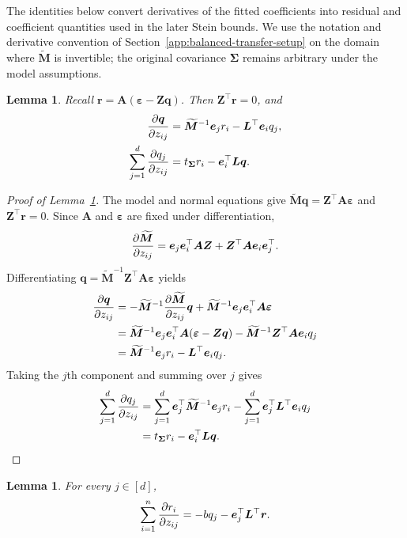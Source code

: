 \documentclass{article}
\theoremstyle{plain}
\newtheorem{lemma}[theorem]{Lemma}
\theoremstyle{definition}
\theoremstyle{definition}
\def\mathbold{\boldsymbol}
\def\cal{\mathcal}
\def\bA{\mathbold{A}}\def\calA{{\cal A}}\def\scrA{{\mathscr A}}\def\Ahat{\widehat{A}}\def\Atil{{\widetilde A}}
\def\bL{\mathbold{L}}\def\hbL{{\widehat{\bL}}}\def\tbL{{\widetilde{\bL}}}
\def\bM{\mathbold{M}}\def\hbM{{\widehat{\bM}}}\def\tbM{{\widetilde{\bM}}}
\def\bq{\mathbold{q}}\def\qhat{\widehat{q}}\def\qtil{\widetilde{q}}\def\qbar{{\overline q}}
\def\br{\mathbold{r}}\def\rhat{\widehat{r}}\def\rtil{\widetilde{r}}\def\rbar{{\overline r}}
\def\be{\mathbold{e}}
\def\bZ{\mathbold{Z}}\def\hbZ{{\widehat{\bZ}}}\def\tbZ{{\widetilde{\bZ}}}
\def\ep{\varepsilon}\def\eps{\epsilon}\def\veps{\varepsilon}
\def\bep{ {\mathbold{\ep} }}
\def\bSigma{\mathbold{\Sigma}}\def\hbSigma{{\widehat{\bSigma}}}
\begin{document}
\label{app:intermediate-result-proofs}

The identities below convert derivatives of the fitted coefficients into
residual and coefficient quantities used in the later Stein bounds. We
use the notation and derivative convention of
Section~\ref{app:balanced-transfer-setup} on the domain where
$\widetilde{\bM}$ is invertible; the original covariance $\bSigma$
remains arbitrary under the model assumptions.

\begin{lemma}\label{lem:dot-beta}
Recall $\br=\bA(\bep-\bZ\bq)$.  Then $\bZ^\top\br=0$, and
\begin{align*}
    \pdv{\bq}{z_{ij}}
    &=\widetilde{\bM}^{-1}\be_jr_i-\bL^\top\be_iq_j,\\
    \sum_{j=1}^d\pdv{q_j}{z_{ij}}
    &=t_{\bSigma}r_i-\be_i^\top\bL\bq.
\end{align*}
\end{lemma}

\begin{proof}[Proof of Lemma~\ref{lem:dot-beta}]
The model and normal equations give
$\widetilde{\bM}\bq=\bZ^\top\bA\bep$ and $\bZ^\top\br=0$.
Since $\bA$ and $\bep$ are fixed under differentiation,
\begin{align*}
    \pdv{\widetilde{\bM}}{z_{ij}}
    =\be_j\be_i^\top\bA\bZ+\bZ^\top\bA\be_i\be_j^\top.
\end{align*}
Differentiating $\bq=\widetilde{\bM}^{-1}\bZ^\top\bA\bep$ yields
\begin{align*}
    \pdv{\bq}{z_{ij}}
    &=-\widetilde{\bM}^{-1}
       \pdv{\widetilde{\bM}}{z_{ij}}\bq
       +\widetilde{\bM}^{-1}\be_j\be_i^\top\bA\bep\\
    &=\widetilde{\bM}^{-1}\be_j
       \be_i^\top\bA(\bep-\bZ\bq)
       -\widetilde{\bM}^{-1}\bZ^\top\bA\be_iq_j\\
    &=\widetilde{\bM}^{-1}\be_jr_i-\bL^\top\be_iq_j.
\end{align*}
Taking the $j$th component and summing over $j$ gives
\begin{align*}
    \sum_{j=1}^d\pdv{q_j}{z_{ij}}
    &=\sum_{j=1}^d\be_j^\top\widetilde{\bM}^{-1}\be_jr_i
       -\sum_{j=1}^d\be_j^\top\bL^\top\be_iq_j\\
    &=t_{\bSigma}r_i-\be_i^\top\bL\bq.
\end{align*}
\end{proof}

\begin{lemma}\label{lem:dot-r}
For every $j\in[d]$,
\begin{align*}
    \sum_{i=1}^n\pdv{r_i}{z_{ij}}
    =-bq_j-\be_j^\top\bL^\top\br.
\end{align*}
\end{lemma}
\end{document}
